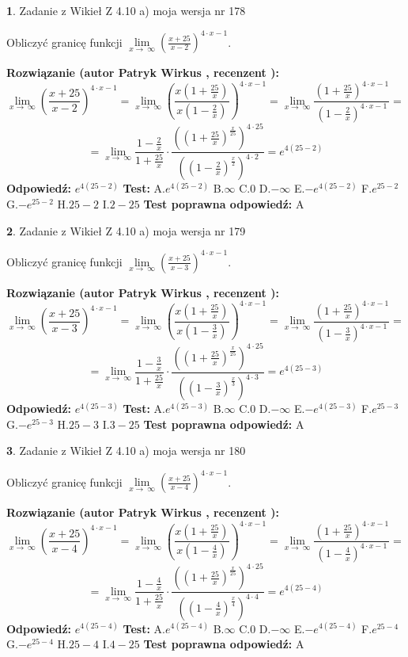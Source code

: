 \documentclass[12pt, a4paper]{article}
\theoremstyle{definition} %
\newtheorem{zad}{}
\newcommand{\zadStart}[1]{\begin{zad}#1\newline}
\newcommand{\zadStop}{\end{zad}}
\newcommand{\rozwStart}[2]{\noindent \textbf{Rozwiązanie (autor #1 , recenzent #2): }\newline}
\newcommand{\rozwStop}{\newline}
\newcommand{\odpStart}{\noindent \textbf{Odpowiedź:}\newline}
\newcommand{\odpStop}{\newline}
\newcommand{\testStart}{\noindent \textbf{Test:}\newline}
\newcommand{\testStop}{\newline}
\newcommand{\kluczStart}{\noindent \textbf{Test poprawna odpowiedź:}\newline}
\newcommand{\kluczStop}{\newline}
\begin{document}
\zadStart{Zadanie z Wikieł Z 4.10 a) moja wersja nr 178}


Obliczyć granicę funkcji  $\lim\limits_{x\to\ \infty}(\frac{x+25}{x-2})^{4\cdot x-1}$.
\zadStop
\rozwStart{Patryk Wirkus}{}
$$\lim\limits_{x\to\ \infty}(\frac{x+25}{x-2})^{4\cdot x-1} = \lim\limits_{x\to\ \infty}(\frac{x(1+\frac{25}{x})}{x(1-\frac{2}{x})})^{4\cdot x-1}=\lim\limits_{x\to\ \infty}\frac{(1+\frac{25}{x})^{4\cdot x-1}}{(1-\frac{2}{x})^{4\cdot x-1}}=$$
$$=\lim\limits_{x\to\ \infty}\frac{1-\frac{2}{x}}{1+\frac{25}{x}}\cdot\frac{((1+\frac{25}{x})^{\frac{x}{25}})^{4\cdot25}}{((1-\frac{2}{x})^{\frac{x}{2}})^{4\cdot2}}=e^{4(25-2)}$$
\rozwStop
\odpStart
$e^{4(25-2)}$
\odpStop
\testStart
A.$e^{4(25-2)}$ B.$\infty$ C.$0$ D.$-\infty$ E.$-e^{4(25-2)}$
F.$e^{25-2}$ G.$-e^{25-2}$
H.$25-2$
I.$2-25$
\testStop
\kluczStart
A
\kluczStop



\zadStart{Zadanie z Wikieł Z 4.10 a) moja wersja nr 179}


Obliczyć granicę funkcji  $\lim\limits_{x\to\ \infty}(\frac{x+25}{x-3})^{4\cdot x-1}$.
\zadStop
\rozwStart{Patryk Wirkus}{}
$$\lim\limits_{x\to\ \infty}(\frac{x+25}{x-3})^{4\cdot x-1} = \lim\limits_{x\to\ \infty}(\frac{x(1+\frac{25}{x})}{x(1-\frac{3}{x})})^{4\cdot x-1}=\lim\limits_{x\to\ \infty}\frac{(1+\frac{25}{x})^{4\cdot x-1}}{(1-\frac{3}{x})^{4\cdot x-1}}=$$
$$=\lim\limits_{x\to\ \infty}\frac{1-\frac{3}{x}}{1+\frac{25}{x}}\cdot\frac{((1+\frac{25}{x})^{\frac{x}{25}})^{4\cdot25}}{((1-\frac{3}{x})^{\frac{x}{3}})^{4\cdot3}}=e^{4(25-3)}$$
\rozwStop
\odpStart
$e^{4(25-3)}$
\odpStop
\testStart
A.$e^{4(25-3)}$ B.$\infty$ C.$0$ D.$-\infty$ E.$-e^{4(25-3)}$
F.$e^{25-3}$ G.$-e^{25-3}$
H.$25-3$
I.$3-25$
\testStop
\kluczStart
A
\kluczStop



\zadStart{Zadanie z Wikieł Z 4.10 a) moja wersja nr 180}


Obliczyć granicę funkcji  $\lim\limits_{x\to\ \infty}(\frac{x+25}{x-4})^{4\cdot x-1}$.
\zadStop
\rozwStart{Patryk Wirkus}{}
$$\lim\limits_{x\to\ \infty}(\frac{x+25}{x-4})^{4\cdot x-1} = \lim\limits_{x\to\ \infty}(\frac{x(1+\frac{25}{x})}{x(1-\frac{4}{x})})^{4\cdot x-1}=\lim\limits_{x\to\ \infty}\frac{(1+\frac{25}{x})^{4\cdot x-1}}{(1-\frac{4}{x})^{4\cdot x-1}}=$$
$$=\lim\limits_{x\to\ \infty}\frac{1-\frac{4}{x}}{1+\frac{25}{x}}\cdot\frac{((1+\frac{25}{x})^{\frac{x}{25}})^{4\cdot25}}{((1-\frac{4}{x})^{\frac{x}{4}})^{4\cdot4}}=e^{4(25-4)}$$
\rozwStop
\odpStart
$e^{4(25-4)}$
\odpStop
\testStart
A.$e^{4(25-4)}$ B.$\infty$ C.$0$ D.$-\infty$ E.$-e^{4(25-4)}$
F.$e^{25-4}$ G.$-e^{25-4}$
H.$25-4$
I.$4-25$
\testStop
\kluczStart
A
\kluczStop
\end{document}
